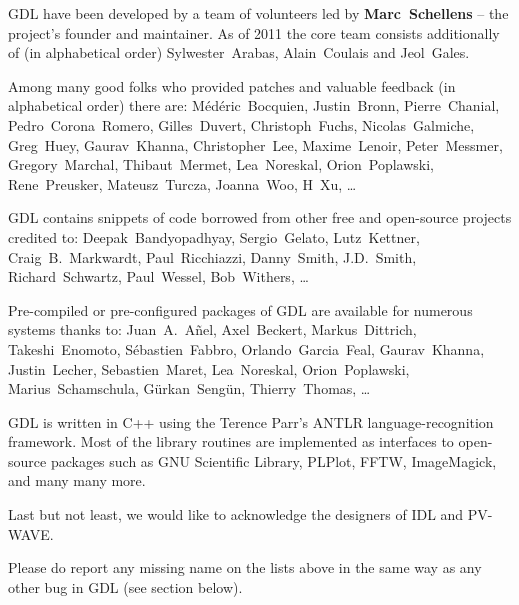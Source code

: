 
GDL have been developed by a team of volunteers led by {\bf Marc~Schellens} --
  the project's founder and maintainer.
As of 2011 the core team consists additionally of (in alphabetical order)
  Sylwester~Arabas, Alain~Coulais and Jeol~Gales.

Among many good folks who provided patches and valuable feedback (in alphabetical order) there are:
M\'ed\'eric~Bocquien, %
Justin~Bronn, %
Pierre~Chanial, %
Pedro~Corona~Romero, %
Gilles~Duvert, %
Christoph~Fuchs, %
Nicolas~Galmiche, %
Greg~Huey, %
Gaurav~Khanna, %
Christopher~Lee, %
Maxime~Lenoir, %
Peter~Messmer, %
Gregory~Marchal, %
Thibaut~Mermet, %
Lea~Noreskal, %
Orion~Poplawski, %
Rene~Preusker, %
Mateusz~Turcza, %
Joanna~Woo, %
H~Xu, %
\ldots

GDL contains snippets of code borrowed from other free and open-source projects credited to:
Deepak~Bandyopadhyay, %
Sergio~Gelato, %
Lutz~Kettner, %
Craig~B.~Markwardt, %
Paul~Ricchiazzi, %
Danny~Smith, %
J.D.~Smith, %
Richard~Schwartz, %
Paul~Wessel, %
Bob~Withers, %
\ldots

Pre-compiled or pre-configured packages of GDL are available for numerous systems thanks to:
Juan~A.~A\~nel, %
Axel~Beckert, %
Markus~Dittrich, %
Takeshi~Enomoto, %
S\'ebastien~Fabbro, %
Orlando~Garcia~Feal, %
Gaurav~Khanna, %
Justin~Lecher, %
Sebastien~Maret, %
Lea~Noreskal, %
Orion~Poplawski, %
Marius~Schamschula, %
G\"urkan~Seng\"un, %
Thierry~Thomas, %
\ldots

GDL is written in C++ using the Terence Parr's ANTLR language-recognition framework. 
Most of the library routines are implemented as interfaces to open-source packages 
  such as GNU Scientific Library, PLPlot, FFTW, ImageMagick, and many many more. 

Last but not least, we would like to acknowledge the designers of IDL and PV-WAVE.

Please do report any missing name on the lists above in the same way
  as any other bug in GDL (see section below).
